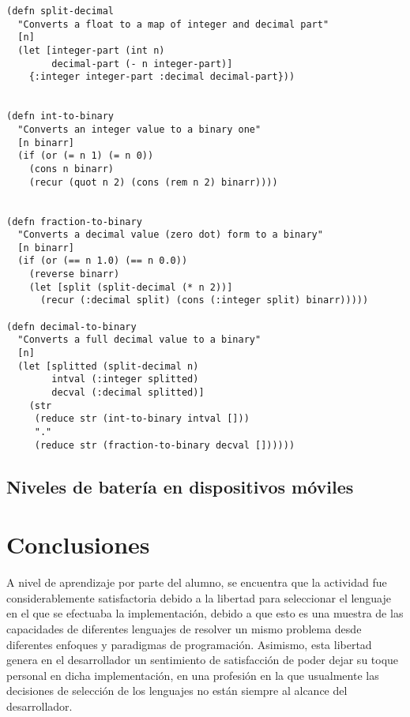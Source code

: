 \documentclass[stu, 12pt, letterpaper, donotrepeattitle, floatsintext, natbib]{apa7}
\begin{document}
\begin{verbatim}
(defn split-decimal 
  "Converts a float to a map of integer and decimal part" 
  [n]
  (let [integer-part (int n)
        decimal-part (- n integer-part)]
    {:integer integer-part :decimal decimal-part}))


(defn int-to-binary
  "Converts an integer value to a binary one"
  [n binarr]
  (if (or (= n 1) (= n 0))
    (cons n binarr)
    (recur (quot n 2) (cons (rem n 2) binarr))))


(defn fraction-to-binary
  "Converts a decimal value (zero dot) form to a binary"
  [n binarr]
  (if (or (== n 1.0) (== n 0.0))   
    (reverse binarr)
    (let [split (split-decimal (* n 2))]
      (recur (:decimal split) (cons (:integer split) binarr)))))

(defn decimal-to-binary 
  "Converts a full decimal value to a binary"
  [n]
  (let [splitted (split-decimal n)
        intval (:integer splitted)
        decval (:decimal splitted)]
    (str 
     (reduce str (int-to-binary intval []))
     "."
     (reduce str (fraction-to-binary decval [])))))
\end{verbatim}

\subsection{Niveles de batería en dispositivos móviles}



\section{\large Conclusiones}
A nivel de aprendizaje por parte del alumno, se encuentra que la actividad fue considerablemente satisfactoria debido a la libertad para seleccionar el lenguaje en el que se efectuaba la implementación, debido a que esto es una muestra de las capacidades de diferentes lenguajes de resolver un mismo problema desde diferentes enfoques y paradigmas de programación. Asimismo, esta libertad genera en el desarrollador un sentimiento de satisfacción de poder dejar su toque personal en dicha implementación, en una profesión en la que usualmente las decisiones de selección de los lenguajes no están siempre al alcance del desarrollador.



\newpage
\renewcommand\refname{\large\textbf{Referencias}}

\end{document}
